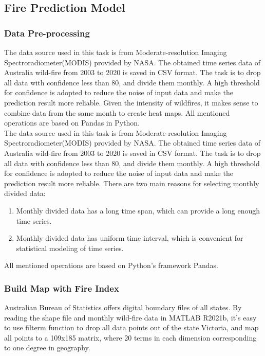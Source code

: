 \documentclass[
]{article}
\author{}
\date{}
\begin{document}
\subsection{Fire Prediction Model}

\hypertarget{data-pre-processing}{%
\subsubsection{Data Pre-processing}\label{data-pre-processing}}

The data source used in this task is from Moderate-resolution Imaging
Spectroradiometer(MODIS) provided by NASA. The obtained time series data
of Australia wild-fire from 2003 to 2020 is saved in CSV format. The
task is to drop all data with confidence less than 80, and divide them
monthly. A high threshold for confidence is adopted to reduce the noise
of input data and make the prediction result more reliable. Given the
intensity of wildfires, it makes sense to combine data from the same
month to create heat maps. All mentioned operations are based on Pandas
in Python.\\
The data source used in this task is from Moderate-resolution Imaging
Spectroradiometer(MODIS) provided by NASA. The obtained time series data
of Australia wild-fire from 2003 to 2020 is saved in CSV format. The
task is to drop all data with confidence less than 80, and divide them
monthly. A high threshold for confidence is adopted to reduce the noise
of input data and make the prediction result more reliable. There are
two main reasons for selecting monthly divided data:

\begin{enumerate}
\def\labelenumi{\arabic{enumi}.}
\item
  Monthly divided data has a long time span, which can provide a long
  enough time series.
\item
  Monthly divided data has uniform time interval, which is convenient
  for statistical modeling of time series.
\end{enumerate}

All mentioned operations are based on Python's framework Pandas.

\hypertarget{build-map-with-fire-index}{%
\subsubsection{Build Map with Fire
Index}\label{build-map-with-fire-index}}

Australian Bureau of Statistics offers digital boundary files of all
states. By reading the shape file and monthly wild-fire data in MATLAB
R2021b, it's easy to use filterm function to drop all data points out of
the state Victoria, and map all points to a 109x185 matrix, where 20
terms in each dimension corresponding to one degree in geography.
\end{document}

